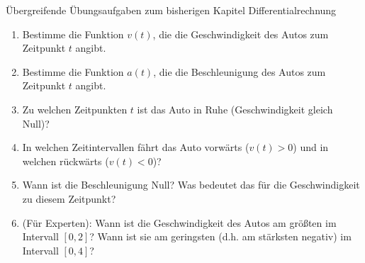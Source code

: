 \begin{aufgabenumgebung}[A:DiffUebergreifend]{Übergreifende Übungsaufgaben zum bisherigen Kapitel Differentialrechnung}
\begin{enumerate}
        \begin{enumerate}
            \item Bestimme die Funktion $v(t)$, die die Geschwindigkeit des Autos zum Zeitpunkt $t$ angibt.
            \item Bestimme die Funktion $a(t)$, die die Beschleunigung des Autos zum Zeitpunkt $t$ angibt.
            \item Zu welchen Zeitpunkten $t$ ist das Auto in Ruhe (Geschwindigkeit gleich Null)?
            \item In welchen Zeitintervallen fährt das Auto vorwärts ($v(t)>0$) und in welchen rückwärts ($v(t)<0$)?
            \item Wann ist die Beschleunigung Null? Was bedeutet das für die Geschwindigkeit zu diesem Zeitpunkt?
            \item (Für Experten): Wann ist die Geschwindigkeit des Autos am größten im Intervall $[0, 2]$? Wann ist sie am geringsten (d.h. am stärksten negativ) im Intervall $[0, 4]$?
        \end{enumerate}
\end{enumerate}
\end{aufgabenumgebung}




